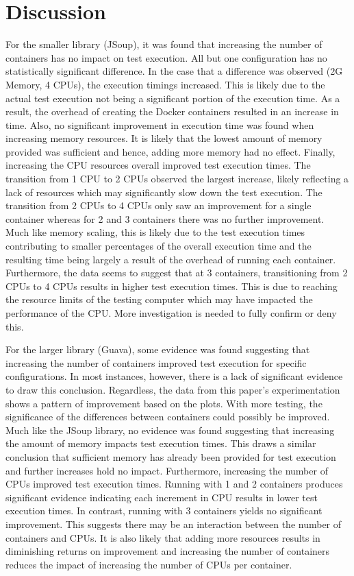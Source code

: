 \section{Discussion}
\label{Discussion}

For the smaller library (JSoup), it was found that increasing the number of containers has no impact on test execution. All but one configuration has no statistically significant difference. In the case that a difference was observed (2G Memory, 4 CPUs), the execution timings increased. This is likely due to the actual test execution not being a significant portion of the execution time. As a result, the overhead of creating the Docker containers resulted in an increase in time. Also, no significant improvement in execution time was found when increasing memory resources. It is likely that the lowest amount of memory provided was sufficient and hence, adding more memory had no effect. Finally, increasing the CPU resources overall improved test execution times. The transition from 1 CPU to 2 CPUs observed the largest increase, likely reflecting a lack of resources which may significantly slow down the test execution. The transition from 2 CPUs to 4 CPUs only saw an improvement for a single container whereas for 2 and 3 containers there was no further improvement. Much like memory scaling, this is likely due to the test execution times contributing to smaller percentages of the overall execution time and the resulting time being largely a result of the overhead of running each container. Furthermore, the data seems to suggest that at 3 containers, transitioning from 2 CPUs to 4 CPUs results in higher test execution times. This is due to reaching the resource limits of the testing computer which may have impacted the performance of the CPU. More investigation is needed to fully confirm or deny this. 

For the larger library (Guava), some evidence was found suggesting that increasing the number of containers improved test execution for specific configurations. In most instances, however, there is a lack of significant evidence to draw this conclusion. Regardless, the data from this paper’s experimentation shows a pattern of improvement based on the plots. With more testing, the significance of the differences between containers could possibly be improved. Much like the JSoup library, no evidence was found suggesting that increasing the amount of memory impacts test execution times. This draws a similar conclusion that sufficient memory has already been provided for test execution and further increases hold no impact. Furthermore, increasing the number of CPUs improved test execution times. Running with 1 and 2 containers produces significant evidence indicating each increment in CPU results in lower test execution times. In contrast, running with 3 containers yields no significant improvement. This suggests there may be an interaction between the number of containers and CPUs. It is also likely that adding more resources results in diminishing returns on improvement and increasing the number of containers reduces the impact of increasing the number of CPUs per container. 


